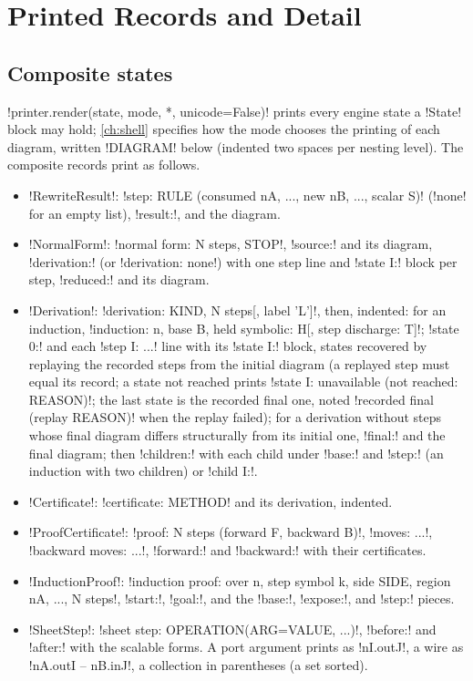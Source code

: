 \section{Printed Records and Detail}\label{sec:language-records}

\subsection{Composite states}

\py!printer.render(state, mode, *, unicode=False)! prints every engine state a \py!State! block may hold; \cref{ch:shell} specifies how the mode chooses the printing of each diagram, written \code!DIAGRAM! below (indented two spaces per nesting level). The composite records print as follows.
\begin{itemize}
\item \py!RewriteResult!: \code!step: RULE (consumed nA, ..., new nB, ..., scalar S)! (\code!none! for an empty list), \code!result:!, and the diagram.
\item \py!NormalForm!: \code!normal form: N steps, STOP!, \code!source:! and its diagram, \code!derivation:! (or \code!derivation: none!) with one step line and \code!state I:! block per step, \code!reduced:! and its diagram.
\item \py!Derivation!: \code!derivation: KIND, N steps[, label 'L']!, then, indented: for an induction, \code!induction: n, base B, held symbolic: H[, step discharge: T]!; \code!state 0:! and each \code!step I: ...! line with its \code!state I:! block, states recovered by replaying the recorded steps from the initial diagram (a replayed step must equal its record; a state not reached prints \code!state I: unavailable (not reached: REASON)!; the last state is the recorded final one, noted \code!recorded final (replay REASON)! when the replay failed); for a derivation without steps whose final diagram differs structurally from its initial one, \code!final:! and the final diagram; then \code!children:! with each child under \code!base:! and \code!step:! (an induction with two children) or \code!child I:!.
\item \py!Certificate!: \code!certificate: METHOD! and its derivation, indented.
\item \py!ProofCertificate!: \code!proof: N steps (forward F, backward B)!, \code!moves: ...!, \code!backward moves: ...!, \code!forward:! and \code!backward:! with their certificates.
\item \py!InductionProof!: \code!induction proof: over n, step symbol k, side SIDE, region nA, ..., N steps!, \code!start:!, \code!goal:!, and the \code!base:!, \code!expose:!, and \code!step:! pieces.
\item \py!SheetStep!: \code!sheet step: OPERATION(ARG=VALUE, ...)!, \code!before:! and \code!after:! with the scalable forms. A port argument prints as \code!nI.outJ!, a wire as \code!nA.outI -- nB.inJ!, a collection in parentheses (a set sorted).
\end{itemize}
